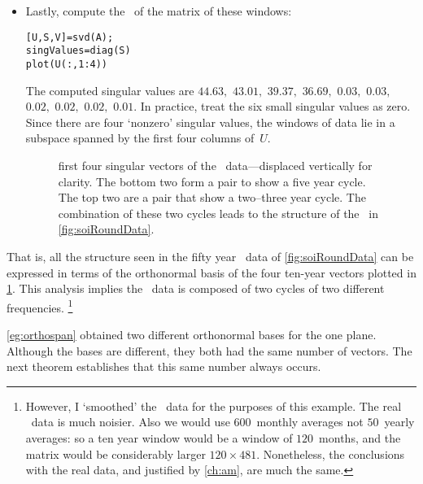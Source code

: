 \begin{example}
\begin{itemize}
\item Lastly, compute the \svd\ of the matrix of these windows:
\begin{verbatim}
[U,S,V]=svd(A);
singValues=diag(S)
plot(U(:,1:4))
\end{verbatim}
\setbox\ajrqrbox\hbox{}%
\marginajrbox%
The computed singular values are $44.63,$ $43.01,$ $39.37,$ $36.69,$ $0.03,$ $0.03,$ $0.02,$ $0.02,$ $0.02,$ $0.01$.
In practice, treat the six small singular values as zero.
Since there are four `nonzero' singular values, the windows of data lie in a subspace spanned by the first four columns of~\(U\).
\begin{figure}
\centering

\caption{first four singular vectors of the \soi\ data---displaced vertically for clarity.  
The bottom two form a pair to show a five year cycle.  
The top two are a pair that show a two--three year cycle.  
The combination of these two cycles leads to the structure of the \soi\ in \cref{fig:soiRoundData}.}
\label{fig:soiRoundSubs}
\end{figure}%
\end{itemize}
That is, all the structure seen in the fifty year \soi\ data of \cref{fig:soiRoundData} can be expressed in terms of the  orthonormal basis of the four ten-year vectors plotted in \cref{fig:soiRoundSubs}.
This analysis implies the \soi\ data is composed of two cycles of two different frequencies.%
\footnote{However, I `smoothed' the \soi\ data for the purposes of this example.  The real \soi\ data is much noisier.  
Also we would use \(600\)~monthly averages not \(50\)~yearly averages: so a ten year window would be a window of \(120\)~months, and the matrix would be considerably larger \(120\times481\).  
Nonetheless, the conclusions with the real data, and justified by \cref{ch:am}, are much the same.}
\end{example}



\cref{eg:orthospan} obtained two different orthonormal bases for the one plane.  
Although the bases are different, they both had the same number of vectors.
The next theorem establishes that this same number always occurs.

